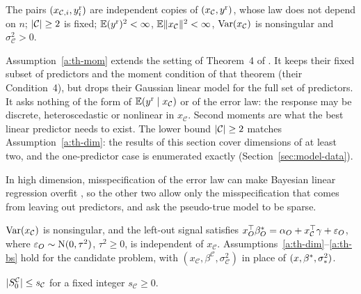 \begin{assumption}\label{a:th-mom}
The pairs $(x_{\mathcal C,i},y^{\mathrm r}_i)$ are independent copies of $(x_{\mathcal C},y^{\mathrm r})$, whose law does not depend on
$n$; $\lvert \mathcal C\rvert\ge2$ is fixed; $\operatorname{\mathbb{E}}(y^{\mathrm r})^2<\infty$, $\operatorname{\mathbb{E}}\lVert x_{\mathcal C}\rVert^2<\infty$, $\operatorname{Var}(x_{\mathcal C})$ is
nonsingular and $\sigma_{\mathcal C}^2>0$.
\end{assumption}

Assumption~\ref{a:th-mom} extends the setting of Theorem~4 of \citet{SongLiang2015}. It keeps their fixed subset
of predictors and the moment condition of that theorem (their Condition~4), but drops their Gaussian linear model for
the full set of predictors. It asks nothing of the form of $\operatorname{\mathbb{E}}(y^{\mathrm r}\mid x_{\mathcal C})$ or of the error law: the response
may be discrete, heteroscedastic or nonlinear in $x_{\mathcal C}$. Second moments are what the best linear predictor
needs to exist. The lower bound $\lvert \mathcal C\rvert\ge2$ matches Assumption~\ref{a:th-dim}: the results of this section cover
dimensions of at least two, and the one-predictor case is enumerated exactly (Section~\ref{sec:model-data}).

In high dimension, misspecification of the error law can make Bayesian linear regression overfit
\citep{GrunwaldVanOmmen2017}, so the other two allow only the misspecification that comes from leaving out predictors, and ask the
pseudo-true model to be sparse.

\begin{assumption}\label{a:th-mis}
$\operatorname{Var}(x_{\mathcal C})$ is nonsingular, and the left-out signal satisfies
$x_O^\top\beta^*_O=\alpha_O+x_{\mathcal C}^\top\gamma+\varepsilon_O$, where $\varepsilon_O\sim\mathrm{N}(0,\tau^2)$,
$\tau^2\ge0$, is independent of $x_{\mathcal C}$. Assumptions~\ref{a:th-dim}--\ref{a:th-bs} hold for the candidate
problem, with $(x_{\mathcal C},\beta^{\mathcal C},\sigma_{\mathcal C}^2)$ in place of $(x,\beta^*,\sigma_*^2)$.
\end{assumption}

\begin{assumption}\label{a:th-sparse-c}
$\lvert S_0^{\mathcal C}\rvert\le s_{\mathcal C}$ for a fixed integer $s_{\mathcal C}\ge0$.
\end{assumption}

